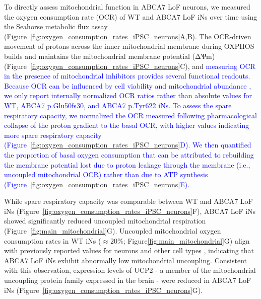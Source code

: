 \documentclass[12pt]{article}
\begin{document}
To directly assess mitochondrial function in ABCA7 LoF neurons, we measured the oxygen consumption rate (OCR) of WT and ABCA7 LoF iNs over time using the Seahorse metabolic flux assay (Figure~\ref{fig:oxygen_consumption_rates_iPSC_neurons}A,B). The OCR-driven movement of protons across the inner mitochondrial membrane during OXPHOS builds and maintains the mitochondrial membrane potential (ΔѰm)(Figure~\ref{fig:oxygen_consumption_rates_iPSC_neurons}C), and  \newcommand{\quoteC}{\textcolor{blue}{measuring OCR in the presence of mitochondrial inhibitors provides several functional readouts. Because OCR can be influenced by cell viability and mitochondrial abundance \cite{Divakaruni2014-eq,Gu2021-ms}, we only report internally normalized OCR ratios rather than absolute values \cite{Divakaruni2022-bp} for WT, ABCA7 p.Glu50fs30, and ABCA7 p.Tyr622 iNs. To assess the spare respiratory capacity, we normalized the OCR measured following pharmacological collapse of the proton gradient to the basal OCR, with higher values indicating more spare respiratory capacity \cite{Divakaruni2022-bp} (Figure~\ref{fig:oxygen_consumption_rates_iPSC_neurons}D). We then quantified the proportion of basal oxygen consumption that can be attributed to rebuilding the membrane potential lost due to proton leakage through the membrane (i.e., uncoupled mitochondrial OCR) rather than due to ATP synthesis \cite{Divakaruni2022-bp} (Figure~\ref{fig:oxygen_consumption_rates_iPSC_neurons}E).\label{quoteC-label}}}
\quoteC

While spare respiratory capacity was comparable between WT and ABCA7 LoF iNs (Figure~\ref{fig:oxygen_consumption_rates_iPSC_neurons}F), ABCA7 LoF iNs showed significantly reduced uncoupled mitochondrial respiration (Figure~\ref{fig:main_mitochondrial}G). Uncoupled mitochondrial oxygen consumption rates in WT iNs ($\approx 20\%$; Figure\ref{fig:main_mitochondrial}G) align with previously reported values for neurons and other cell types \cite{Divakaruni2011-uj,Jekabsons2004-fn,Jain2024-br}, indicating that ABCA7 LoF iNs exhibit abnormally low mitochondrial uncoupling. Consistent with this observation, expression levels of UCP2 - a member of the mitochondrial uncoupling protein family expressed in the brain \cite{Kumar2022-bb} - were reduced in ABCA7 LoF iNs (Figure~\ref{fig:oxygen_consumption_rates_iPSC_neurons}G). 
\end{document}

